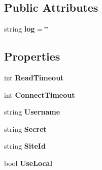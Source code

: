 \subsection*{Public Attributes}
\begin{DoxyCompactItemize}
\item 
\hypertarget{class_h_d3_1_1_h_d3_af413d17666d552b40589ad290802f868}{string {\bfseries log} = \char`\"{}\char`\"{}}\label{class_h_d3_1_1_h_d3_af413d17666d552b40589ad290802f868}

\end{DoxyCompactItemize}
\subsection*{Properties}
\begin{DoxyCompactItemize}
\item 
\hypertarget{class_h_d3_1_1_h_d3_a52ca1bb216ac5a05d0f97780b5b16dee}{int {\bfseries Read\+Timeout}}\label{class_h_d3_1_1_h_d3_a52ca1bb216ac5a05d0f97780b5b16dee}

\item 
\hypertarget{class_h_d3_1_1_h_d3_a9fbf3afb5c9b20dbd781c74864fbed59}{int {\bfseries Connect\+Timeout}}\label{class_h_d3_1_1_h_d3_a9fbf3afb5c9b20dbd781c74864fbed59}

\item 
\hypertarget{class_h_d3_1_1_h_d3_af24410685eb95084649ac58b24e5349e}{string {\bfseries Username}}\label{class_h_d3_1_1_h_d3_af24410685eb95084649ac58b24e5349e}

\item 
\hypertarget{class_h_d3_1_1_h_d3_ac95f6be2551f612f59bad083abacfb42}{string {\bfseries Secret}}\label{class_h_d3_1_1_h_d3_ac95f6be2551f612f59bad083abacfb42}

\item 
\hypertarget{class_h_d3_1_1_h_d3_a2aaf415e233764b3da83eacaeab7d62d}{string {\bfseries Site\+Id}}\label{class_h_d3_1_1_h_d3_a2aaf415e233764b3da83eacaeab7d62d}

\item 
\hypertarget{class_h_d3_1_1_h_d3_a0d7be479af393a7f9e17d329f123db41}{bool {\bfseries Use\+Local}}\label{class_h_d3_1_1_h_d3_a0d7be479af393a7f9e17d329f123db41}


\end{DoxyCompactItemize}
